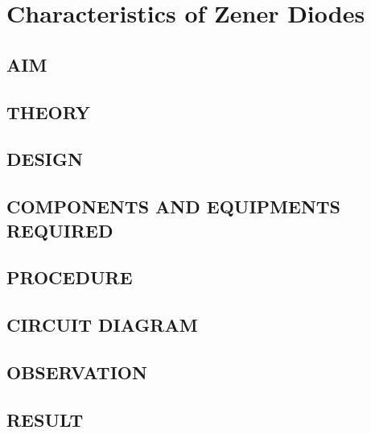 \chapter[Characteristics of Zener Diodes]{Characteristics of Zener Diodes}
\section*[AIM]{AIM}

\section*[THEORY]{THEORY}
\section*[DESIGN]{DESIGN}
\section*[COMPONENTS AND EQUIPMENTS REQUIRED]{COMPONENTS AND EQUIPMENTS REQUIRED}
\section*[PROCEDURE]{PROCEDURE}
\section*[CIRCUIT DIAGRAM]{CIRCUIT DIAGRAM}
\section*[OBSERVATION]{OBSERVATION}
\section*[RESULT]{RESULT}
